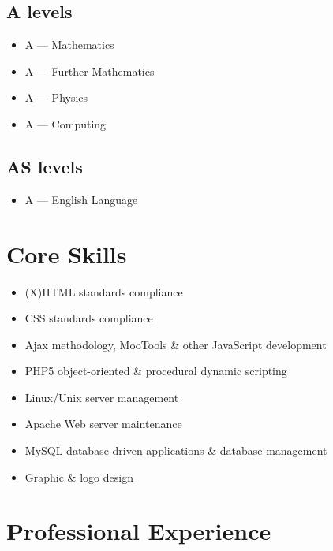 \documentclass{cv}
\begin{document}
\subsection*{A levels}

\begin{itemize}
\item A --- Mathematics
\item A --- Further Mathematics
\item A --- Physics
\item A --- Computing
\end{itemize}

\subsection*{AS levels}

\begin{itemize}
\item A --- English Language
\end{itemize}

\section{Core Skills}

\begin{itemize}
\item (X)HTML standards compliance
\item CSS standards compliance
\item Ajax methodology, MooTools \& other JavaScript development
\item PHP5 object-oriented \& procedural dynamic scripting
\item Linux/Unix server management
\item Apache Web server maintenance
\item MySQL database-driven applications \& database management
\item Graphic \& logo design
\end{itemize}

\section{Professional Experience}
\end{document}
